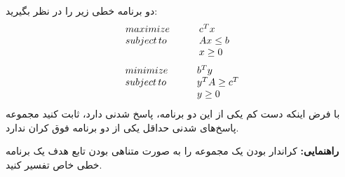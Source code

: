 دو برنامه خطی زیر را در نظر بگیرید:
\[
    \begin{array}{l l}
        maximize    & \hspace*{20pt} c^T x       \\
        subject\,to & \hspace*{20pt} A x \leq b \hspace*{10pt} \\
                    & \hspace*{20pt} x \geq 0
    \end{array}
\]
\[
    \begin{array}{l l}
        minimize    & \hspace*{20pt} b^T y           \\
        subject\,to & \hspace*{20pt} y^T A \geq c^T  \\
                    & \hspace*{20pt} y \geq 0
    \end{array}
\]
با فرض اینکه دست کم یکی از این دو برنامه، پاسخ شدنی دارد، ثابت کنید مجموعه پاسخ‌های شدنی حداقل یکی از دو برنامه فوق کران ندارد.

\textbf{راهنمایی:}
کراندار بودن یک مجموعه را به صورت متناهی بودن تابع هدف یک برنامه خطی خاص تفسیر کنید.